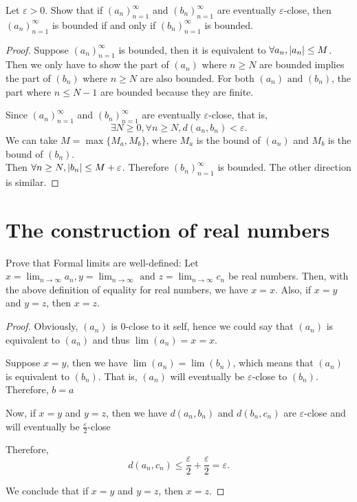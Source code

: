 \begin{exercise}
  Let $\varepsilon > 0$. Show that if $(a_n)_{n=1}^\infty$ and $(b_n)_{n=1}^\infty$ are eventually $\varepsilon$-close,
  then $(a_n)_{n=1}^\infty$ is bounded if and only if $(b_n)_{n=1}^\infty$ is bounded.
\end{exercise}
\begin{proof}
  Suppose $(a_n)_{n=1}^\infty$ is bounded, then it is equivalent to $\forall a_n, \abs{a_n} \leq M$. 
  Then we only have to show the part of $(a_n)$ where $n \geq N$ are bounded implies the part of $(b_n)$ where $n \geq N$ are also bounded.
  For both $(a_n) \text{\ and\ } (b_n)$, the part where $n \leq N-1$ are bounded because they are finite.
  \par Since $(a_n)_{n=1}^\infty$ and $(b_n)_{n=1}^\infty$ are eventually $\varepsilon$-close, that is, $$\exists N \geq 0, \forall n \geq N, d(a_n, b_n) < \varepsilon.$$
  We can take $M = \max\{M_a, M_b\}$, where $M_a$ is the bound of $(a_n)$ and $M_b$ is the bound of $(b_n)$.
  \\ Then $\forall n \geq N, \abs{b_n} \leq M + \varepsilon$. Therefore $(b_n)_{n=1}^\infty$ is bounded. The other direction is similar.
\end{proof}

\section{The construction of real numbers}

\begin{exercise}
  Prove that Formal limits are well-defined: Let $x = \lim_{n\to \infty}a_n, y = \lim_{n\to \infty} \text{\ and\ } z = \lim_{n \to \infty}c_n$
  be real numbers. Then, with the above definition of equality for real numbers, we have $x = x$. Also, if $x = y$ and $y = z$, then $x = z$.
\end{exercise}

\begin{proof}
  Obviously, $(a_n)$ is 0-close to it self, hence we could say that $(a_n)$ is equivalent to $(a_n)$ and thus $\lim (a_n) = x = x$. \par
  Suppose $x = y$, then we have $\lim (a_n) = \lim (b_n)$, which means that $(a_n)$ is equivalent to $(b_n)$. 
  That is, $(a_n)$ will eventually be $\varepsilon$-close to $(b_n)$. Therefore, $b = a$ \par
  Now, if $x = y$ and $y = z$, then we have $d(a_n, b_n)$ and $d(b_n, c_n)$ are $\varepsilon$-close and will eventually be $\frac{\varepsilon}{2}$-close
  \par Therefore, $$d(a_n, c_n) \leq \frac{\varepsilon}{2} + \frac{\varepsilon}{2} = \varepsilon.$$ 
  \par We conclude that if $x = y$ and $y = z$, then $x = z$.
\end{proof}



